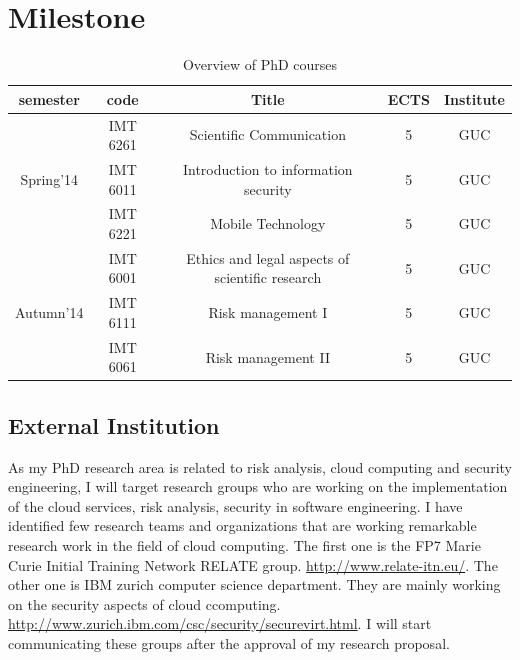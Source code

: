 \documentclass[a4paper,twoside,10pt]{report}
\begin{document}
\chapter{Milestone}\label{milestone}

\begin{table}[H]
	\centering
		\begin{tabular}{|c|c|c|c|c|} \hline 
			\textbf{semester} & \textbf{code} & \textbf{Title} & \textbf{ECTS} & \textbf{Institute} \\ \hline
			
			\multirow{3}{*}{Spring'14} & IMT 6261 & Scientific Communication & 5 & GUC \\
																&IMT 6011 & Introduction to information security & 5 & GUC \\
																&IMT 6221 & Mobile Technology & 5 & GUC\\
																\hline
																
		 \multirow{3}{*}{Autumn'14} & IMT 6001 & Ethics and legal aspects of scientific research & 5 & GUC \\
																&IMT 6111 & Risk management I & 5 & GUC \\
																&IMT 6061 & Risk management II & 5 & GUC \\
																\hline				\hline											
																
		\end{tabular}
	\caption{Overview of PhD courses}
	\label{tab:OverviewOfPhDCourses}
\end{table}

\section{External Institution}\label{ExtInst}

As my PhD research area is related to risk analysis, cloud computing and security engineering, I will target research groups who are working on the implementation of the cloud services, risk analysis, security in software engineering. I have identified few research teams and organizations that are working remarkable research work in the field of cloud computing. The first one is the FP7 Marie Curie Initial Training Network RELATE group. \url{http://www.relate-itn.eu/}. The other one is IBM zurich computer science department. They are mainly working on the security aspects of cloud ccomputing. \url{http://www.zurich.ibm.com/csc/security/securevirt.html}. I will start communicating these groups after the approval of my research proposal.
\end{document}
